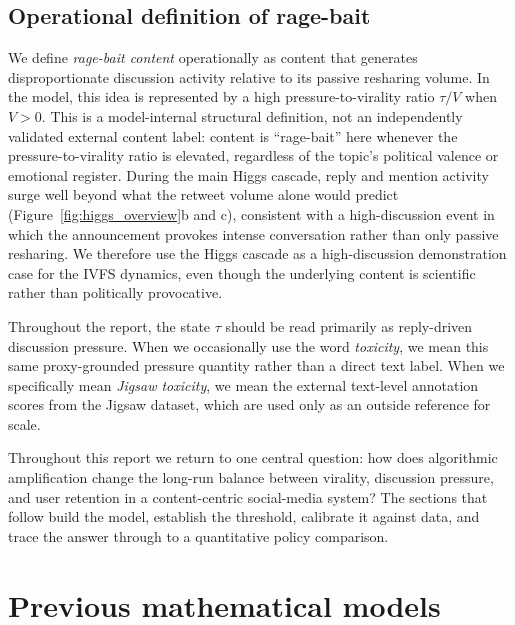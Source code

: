 \documentclass[11pt]{article}
\begin{document}
\subsection{Operational definition of rage-bait}
\label{sec:ragebait-def}

We define \emph{rage-bait content} operationally as content that generates disproportionate discussion activity relative to its passive resharing volume. In the model, this idea is represented by a high pressure-to-virality ratio $\tau/V$ when $V>0$. This is a model-internal structural definition, not an independently validated external content label: content is ``rage-bait'' here whenever the pressure-to-virality ratio is elevated, regardless of the topic's political valence or emotional register. During the main Higgs cascade, reply and mention activity surge well beyond what the retweet volume alone would predict (Figure~\ref{fig:higgs_overview}b and c), consistent with a high-discussion event in which the announcement provokes intense conversation rather than only passive resharing. We therefore use the Higgs cascade as a high-discussion demonstration case for the IVFS dynamics, even though the underlying content is scientific rather than politically provocative.

Throughout the report, the state $\tau$ should be read primarily as reply-driven discussion pressure. When we occasionally use the word \emph{toxicity}, we mean this same proxy-grounded pressure quantity rather than a direct text label. When we specifically mean \emph{Jigsaw toxicity}, we mean the external text-level annotation scores from the Jigsaw dataset, which are used only as an outside reference for scale.

Throughout this report we return to one central question: how does algorithmic amplification change the long-run balance between virality, discussion pressure, and user retention in a content-centric social-media system? The sections that follow build the model, establish the threshold, calibrate it against data, and trace the answer through to a quantitative policy comparison.

\newpage
\section{Previous mathematical models}
\label{sec:previous}
\end{document}
